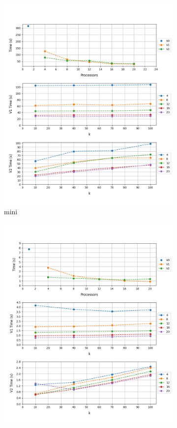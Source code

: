 \documentclass[12pt, a4paper]{article}
\begin{document}
\begin{figure}[h!]
\begin{subfigure}[b]{0.33\textwidth}
         \includegraphics[height=.4\textheight, width=\textwidth, keepaspectratio]{assets/mini.png}
         \caption{mini}
     \end{subfigure}
     \begin{subfigure}[b]{0.33\textwidth}
         \centering
         \includegraphics[height=.4\textheight, width=\textwidth, keepaspectratio]{assets/tv/bbc.png}

\end{subfigure}
\end{figure}
\end{document}
